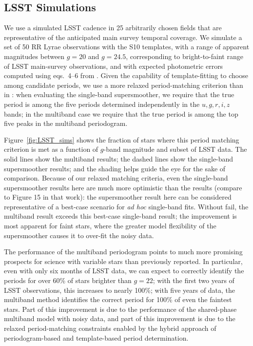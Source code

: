 \documentclass{emulateapj}
\newcommand{\foreign}[1]{{\it #1}}
\newcommand{\adhoc}{\foreign{ad hoc}}
\newcommand{\Fig}[1]{Figure~\ref{fig:#1}}
\newcommand{\fig}[1]{\Fig{#1}}
\begin{document}
\subsection{LSST Simulations}

We use a simulated LSST cadence \citep{opsim1, opsim2, opsim3} in 25 arbitrarily chosen fields
that are representative of the anticipated main survey temporal coverage.
We simulate a set of 50 RR Lyrae observations with the S10 templates, with a range of apparent magnitudes between 
$g=20$ and $g=24.5$, corresponding to bright-to-faint range of LSST main-survey observations, and with expected 
photometric errors computed using eqs.~4--6  from \citet{Ivezic08LSST}. 
Given the capability of template-fitting to choose among candidate periods, we use a more relaxed period-matching criterion than in \citet{Oluseyi12}: when evaluating the single-band supersmoother, we require that the true period is among the five periods determined independently in the $u, g, r, i, z$ bands; in the multiband case we require that the true period is among the top five peaks in the multiband periodogram.

\fig{LSST_sims} shows the fraction of stars where this period matching criterion is met as a function of $g$-band magnitude and subset of LSST data.
The solid lines show the multiband results; the dashed lines show the single-band supersmoother results; and the shading helps guide the eye for the sake of comparison.
Because of our relaxed matching criteria, even the single-band supersmoother results here are much more optimistic than the \citet{Oluseyi12} results (compare to Figure 15 in that work): the supersmoother result here can be considered representative of a best-case scenario for \adhoc{} single-band fits.
Without fail, the multiband result exceeds this best-case single-band result; the improvement is most apparent for faint stars, where the greater model flexibility of the supersmoother causes it to over-fit the noisy data.

The performance of the multiband periodogram points to much more promising prospects for science with variable stars than previously reported.
In particular, even with only six months of LSST data, we can expect to correctly identify the periods for over 60\% of stars brighter than $g=22$; with the first two years of LSST observations, this increases to nearly 100\%; with five years of data, the multiband method identifies the correct period for 100\% of even the faintest stars.
Part of this improvement is due to the performance of the shared-phase multiband model with noisy data, and part of this improvement is due to the relaxed period-matching constraints enabled by the hybrid approach of periodogram-based and template-based period determination.
\end{document}
